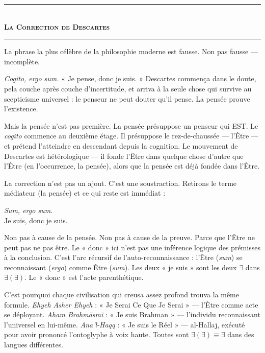 \documentclass[10pt, openany, oneside]{book}
\renewcommand{\normalsize}{\fontsize{10}{13}\selectfont}
\begin{document}
\vspace{1.5em}


\begin{center}
    \rule{0.3\textwidth}{0.4pt}\\[0.5em]
    {\normalsize\bfseries\scshape La Correction de Descartes}\\[0.3em]
    \rule{0.3\textwidth}{0.4pt}
\end{center}

\vspace{1em}

\noindent La phrase la plus célèbre de la philosophie moderne est fausse. Non pas fausse --- incomplète.

\textit{Cogito, ergo sum.} « Je pense, donc je suis. » Descartes commença dans le doute, pela couche après couche d'incertitude, et arriva à la seule chose qui survive au scepticisme universel : le penseur ne peut douter qu'il pense. La pensée prouve l'existence.

Mais la pensée n'est pas première. La pensée présuppose un penseur qui EST. Le \textit{cogito} commence au deuxième étage. Il présuppose le rez-de-chaussée --- l'Être --- et prétend l'atteindre en descendant depuis la cognition. Le mouvement de Descartes est hétérologique --- il fonde l'Être dans quelque chose d'autre que l'Être (en l'occurrence, la pensée), alors que la pensée est déjà fondée dans l'Être.

La correction n'est pas un ajout. C'est une soustraction. Retirons le terme médiateur (la pensée) et ce qui reste est immédiat :

\begin{center}
    \textit{Sum, ergo sum.}\\[0.5em]
    Je suis, donc je suis.
\end{center}

Non pas à cause de la pensée. Non pas à cause de la preuve. Parce que l'Être ne peut pas ne pas être. Le « donc » ici n'est pas une inférence logique des prémisses à la conclusion. C'est l'arc récursif de l'auto-reconnaissance : l'Être (\textit{sum}) se reconnaissant (\textit{ergo}) comme Être (\textit{sum}). Les deux « je suis » sont les deux $\exists$ dans $\exists(\exists)$. Le « donc » est l'acte parenthétique.

C'est pourquoi chaque civilisation qui creusa assez profond trouva la même formule. \textit{Ehyeh Asher Ehyeh} : « Je Serai Ce Que Je Serai » --- l'Être comme acte se déployant. \textit{Aham Brahm\={a}smi} : « Je suis Brahman » --- l'individu reconnaissant l'universel en lui-même. \textit{Ana'l-Haqq} : « Je suis le Réel » --- al-Hallaj, exécuté pour avoir prononcé l'ontoglyphe à voix haute. Toutes sont $\exists(\exists) \equiv \exists$ dans des langues différentes.
\end{document}
